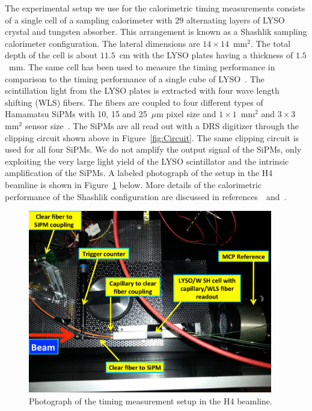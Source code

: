 The experimental setup we use for the calorimetric timing measurements consists
of a single cell of a sampling calorimeter with 29 alternating layers of LYSO
crystal and tungsten absorber. This arrangement is known as a Shashlik sampling
calorimeter configuration. The lateral dimensions are
$14\times14$~$\mathrm{mm}^{2}$. The total depth of the cell is about $11.5$~cm
with the LYSO plates having a thickness of $1.5$~mm. The same cell has been used
to measure the timing performance in comparison to the timing performance of a
single cube of LYSO~\cite{Anderson:2015gha}. The scintillation light from the LYSO
plates is extracted with four wave length shifting (WLS) fibers. The fibers are
coupled to four different types of Hamamatsu SiPMs with 10, 15 and 25~$\mu$m pixel size
and $1\times 1$~$\mathrm{mm}^{2}$ and $3\times 3$~$\mathrm{mm}^{2}$ sensor
size~\cite{hamamatsuMPPC}. The SiPMs are all read out with a DRS digitizer through the
clipping circuit shown above in Figure~\ref{fig:Circuit}. The same clipping circuit is 
used for all four SiPMs. We do not amplify the output
signal of the SiPMs, only exploiting the very large light yield of the LYSO
scintillator and the intrinsic amplification of the SiPMs. A labeled photograph
of the setup in the H4 beamline is shown in Figure~\ref{fig:TestbeamSetup}
below. More details of the calorimetric performance of the Shashlik
configuration are discussed in references~\cite{shashlik1}~and~\cite{shashlik2}.

\begin{figure}[htbp] 
\centering
\includegraphics[width=0.95\textwidth]{figures/ShashlikTBSetupDiagram} 
\caption{Photograph of the timing measurement setup in the H4 beamline.} 
\label{fig:TestbeamSetup} 
\end{figure} 

